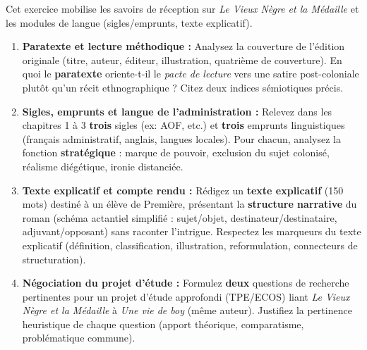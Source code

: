 \documentclass[11pt]{article}
\begin{document}
\begin{exercice}
Cet exercice mobilise les savoirs de réception sur \textit{Le Vieux Nègre et la Médaille} et les modules de langue (sigles/emprunts, texte explicatif).

\begin{enumerate}
    \item \textbf{Paratexte et lecture méthodique :} Analysez la couverture de l'édition originale (titre, auteur, éditeur, illustration, quatrième de couverture). En quoi le \textbf{paratexte} oriente-t-il le \textit{pacte de lecture} vers une satire post-coloniale plutôt qu'un récit ethnographique ? Citez deux indices sémiotiques précis.
    \item \textbf{Sigles, emprunts et langue de l'administration :} Relevez dans les chapitres 1 à 3 \textbf{trois} sigles (ex: AOF, etc.) et \textbf{trois} emprunts linguistiques (français administratif, anglais, langues locales). Pour chacun, analysez la fonction \textbf{stratégique} : marque de pouvoir, exclusion du sujet colonisé, réalisme diégétique, ironie distanciée.
    \item \textbf{Texte explicatif et compte rendu :} Rédigez un \textbf{texte explicatif} (150 mots) destiné à un élève de Première, présentant la \textbf{structure narrative} du roman (schéma actantiel simplifié : sujet/objet, destinateur/destinataire, adjuvant/opposant) sans raconter l'intrigue. Respectez les marqueurs du texte explicatif (définition, classification, illustration, reformulation, connecteurs de structuration).
    \item \textbf{Négociation du projet d'étude :} Formulez \textbf{deux} questions de recherche pertinentes pour un projet d'étude approfondi (TPE/ECOS) liant \textit{Le Vieux Nègre et la Médaille} à \textit{Une vie de boy} (même auteur). Justifiez la pertinence heuristique de chaque question (apport théorique, comparatisme, problématique commune).
\end{enumerate}
\end{exercice}
\end{document}

